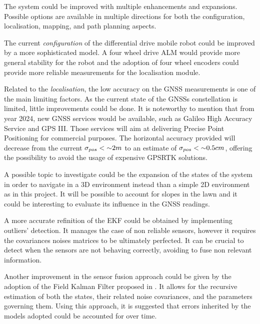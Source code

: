 \noindent 
The system could be improved with multiple enhancements and expansions.
Possible options are available in multiple directions for both the configuration, localisation, mapping, and path planning aspects.

The current \textit{configuration} of the differential drive mobile robot could be improved by a more sophisticated model.
A four wheel drive \gls{ALM} would provide more general stability for the robot and the adoption of four wheel encoders could provide more reliable measurements for the localisation module.


Related to the \textit{localisation}, the low accuracy on the \gls{GNSS} measurements is one of the main limiting factors.
As the current state of the \glspl{GNSS} constellation is limited, little improvements could be done.
It is noteworthy to mention that from year 2024, new \gls{GNSS} services would be available, such as Galileo High Accuracy Service \cite{noauthor_galileo_nodate} and GPS III.
Those services will aim at delivering Precise Point Positioning for commercial purposes.
The horizontal accuracy provided will decrease from the current $\sigma_{pos} < \tiny{\sim} 2m$ to an estimate of $\sigma_{pos} <  \tiny{\sim} 0.5cm$, offering the possibility to avoid the usage of expensive \gls{GPSRTK} solutions.

A possible topic to investigate could be the expansion of the states of the system in order to navigate in a 3D environment instead than a simple 2D environment as in this project.
It will be possible to account for slopes in the lawn and it could be interesting to evaluate its influence in the \gls{GNSS} readings.

A more accurate refinition of the \gls{EKF} could be obtained by implementing outliers' detection.
It manages the case of non reliable sensors, however it requires the covariances noises matrices to be ultimately perfected. 
It can be crucial to detect when the sensors are not behaving correctly, avoiding to fuse non relevant information.

Another improvement in the sensor fusion approach could be given by the adoption of the Field Kalman Filter proposed in \cite{FieldKF}.
It allows for the recursive estimation of both the states, their related noise covariances, and the parameters governing them. 
Using this approach, it is suggested that errors inherited by the models adopted could be accounted for over time.
    
